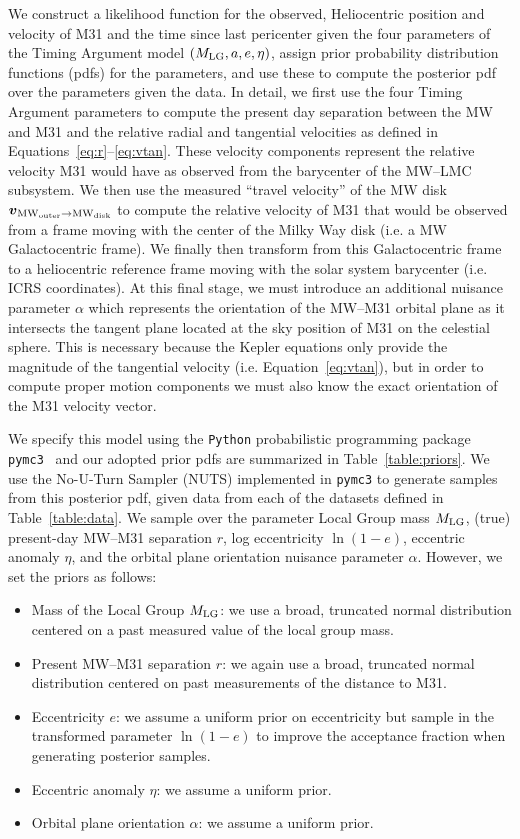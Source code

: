 \documentclass[twocolumn]{aastex631}
\newcommand{\mlg}{\ensuremath{M_{\rm LG}}}
\newcommand{\bov}{\ensuremath{\boldsymbol{v}}}
\newcommand{\vel}[2]{\ensuremath{\bov_{\rm #1 \to #2}}}
\newcommand{\mwouter}{\ensuremath{\textrm{MW}_\textrm{outer}}}
\newcommand{\mwdisk}{\ensuremath{\textrm{MW}_\textrm{disk}}}
\begin{document}
We construct a likelihood function for the observed, Heliocentric position and
velocity of M31 and the time since last pericenter given the four parameters of
the Timing Argument model $(\mlg, a, e, \eta)$, assign prior probability
distribution functions (pdfs) for the parameters, and use these to compute the
posterior pdf over the parameters given the data.
In detail, we first use the four Timing Argument parameters to compute the
present day separation between the MW and M31 and the relative radial and
tangential velocities as defined in Equations~\ref{eq:r}--\ref{eq:vtan}.
These velocity components represent the relative velocity M31 would have as
observed from the barycenter of the MW--LMC subsystem.
We then use the measured ``travel velocity'' of the MW disk
$\vel{\mwouter}{\mwdisk}$ to compute the relative velocity of M31 that would be
observed from a frame moving with the center of the Milky Way disk (i.e. a
MW Galactocentric frame).
We finally then transform from this Galactocentric frame to a heliocentric
reference frame moving with the solar system barycenter (i.e. ICRS coordinates).
At this final stage, we must introduce an additional nuisance parameter $\alpha$
which represents the orientation of the MW--M31 orbital plane as it intersects
the tangent plane located at the sky position of M31 on the celestial sphere.
This is necessary because the Kepler equations only provide the magnitude of the
tangential velocity (i.e. Equation~\ref{eq:vtan}), but in order to compute
proper motion components we must also know the exact orientation of the M31
velocity vector.

We specify this model using the \texttt{Python} probabilistic programming
package \texttt{pymc3}~\citep{Salvatier2016} and our adopted prior pdfs are
summarized in Table~\ref{table:priors}.
We use the No-U-Turn Sampler (NUTS) \citep{Homan2014} implemented in
\texttt{pymc3} to generate samples from this posterior pdf, given data from each
of the datasets defined in Table~\ref{table:data}.
We sample over the parameter Local Group mass $\mlg$, (true) present-day MW--M31
separation $r$, log eccentricity $\ln\left(1 - e\right)$, eccentric anomaly
$\eta$, and the orbital plane orientation nuisance parameter $\alpha$.
However, we set the priors as follows:
\begin{itemize}
  \item Mass of the Local Group $\mlg$: we use a broad, truncated normal
  distribution centered on a past measured value of the local group mass.
  \item Present MW--M31 separation $r$: we again use a broad, truncated normal
  distribution centered on past measurements of the distance to M31.
  \item Eccentricity $e$: we assume a uniform prior on eccentricity but sample
  in the transformed parameter $\ln(1-e)$ to improve the acceptance fraction
  when generating posterior samples.
  \item Eccentric anomaly $\eta$: we assume a uniform prior.
  \item Orbital plane orientation $\alpha$: we assume a uniform prior.
\end{itemize}
\end{document}
